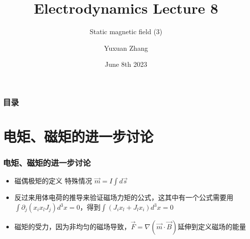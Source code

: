 \documentclass[10pt]{beamer}
\title[About Beamer] %
{Electrodynamics Lecture 8}
\subtitle{ Static magnetic field (3)  }
\author %
{Yuxuan Zhang }
\institute[VFU] %
{
  School of Physics \quad
  Zhejiang University
}
\date[VLC 2021] %
{June 8th 2023}
\begin{document}
\frame{\titlepage}

\begin{frame}
    \frametitle{目录}
    \tableofcontents
\end{frame}


\section{电矩、磁矩的进一步讨论}
\begin{frame}
    \frametitle{电矩、磁矩的进一步讨论}
    \begin{itemize}
    \item 磁偶极矩的定义 \quad 特殊情况 $\vec{m} = I \int d \vec{s} $
    \item 反过来用体电荷的推导来验证磁场力矩的公式，这其中有一个公式需要用$\int\partial_j (x_ix_lJ_j)d^3x = 0 $，得到$\int (J_ix_l +J_lx_i) d^3x = 0$   
    \item 磁矩的受力，因为非均匀的磁场导致，$\vec{F} = \nabla (\vec{m} \cdot \vec{B}) $延伸到定义磁场的能量
    \end{itemize}

\end{frame}
\end{document}
